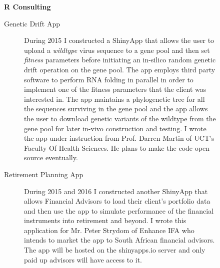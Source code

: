 \newpage
\begin{description}\item[] \begin{description}\item[] {\large \bf  R Consulting }
\begin{description}
 \item[ Genetic Drift App   ]  During 2015 I constructed a ShinyApp
 that allows the user to upload a {\it wildtype} virus sequence  to a gene pool and then set {\it fitness} parameters before
 initiating an in-silico random genetic drift operation on the gene pool. The app employs third party software
 to perform RNA folding in parallel in order to implement one of the fitness parameters that the client was interested in.
 The app maintains a phylogenetic tree for all the sequences surviving in the gene pool and the app allows
 the user to download genetic variants of the wildtype from the gene pool for later in-vivo construction and testing.
 I wrote the app under instruction from Prof. Darren Martin of UCT's Faculty Of Health Sciences. 
 He plans to make the code open source eventually.

 \item[ Retirement Planning  App   ]  During 2015 and 2016 I constructed another ShinyApp
 that allows Financial Advisors to load their client's portfolio data and then use the app to simulate
 performance of the financial instruments into retirement and beyond. I wrote this application for Mr. Peter Strydom of Enhance IFA
 who intends to market the app to South African financial advisors. The app will be hosted on the shinyapps.io server
 and only paid up advisors will have access to it.
 
\end{description}
\end{description}
\end{description}

\label{f0}
